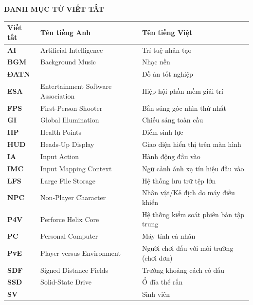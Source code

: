 \documentclass[../DoAn.tex]{subfiles}
\begin{document}
\begin{center}
    \Large{\textbf{DANH MỤC TỪ VIẾT TẮT}}\\
\end{center}
\vspace{1cm}

\begin{longtable}{l p{6cm} p{7cm}}
	\hline
	\textbf{Viết tắt} & \textbf{Tên tiếng Anh} & \textbf{Tên tiếng Việt} \\ \hline
	\textbf{AI}   & Artificial Intelligence             & Trí tuệ nhân tạo \\
	\textbf{BGM}  & Background Music                    & Nhạc nền \\
	\textbf{ĐATN} &                                     & Đồ án tốt nghiệp \\
	\textbf{ESA}  & Entertainment Software Association  & Hiệp hội phần mềm giải trí \\
	\textbf{FPS}  & First-Person Shooter                & Bắn súng góc nhìn thứ nhất \\
	\textbf{GI}   & Global Illumination                 & Chiếu sáng toàn cầu \\
	\textbf{HP}   & Health Points                       & Điểm sinh lực \\
	\textbf{HUD}  & Heads-Up Display                    & Giao diện hiển thị trên màn hình \\
	\textbf{IA}   & Input Action                        & Hành động đầu vào \\	
	\textbf{IMC}  & Input Mapping Context               & Ngữ cảnh ánh xạ tín hiệu đầu vào \\
	\textbf{LFS}  & Large File Storage                  & Hệ thống lưu trữ tệp lớn \\
	\textbf{NPC}  & Non-Player Character                & Nhân vật/Kẻ địch do máy điều khiển \\
	\textbf{P4V}  & Perforce Helix Core                 & Hệ thống kiểm soát phiên bản tập trung \\
	\textbf{PC}   & Personal Computer                   & Máy tính cá nhân \\
	\textbf{PvE}  & Player versus Environment           & Người chơi đấu với môi trường (chơi đơn) \\
	\textbf{SDF}  & Signed Distance Fields              & Trường khoảng cách có dấu \\
	\textbf{SSD}  & Solid-State Drive                   & Ổ đĩa thể rắn \\
	\textbf{SV}   &                                     & Sinh viên \\

\end{longtable}
\end{document}
